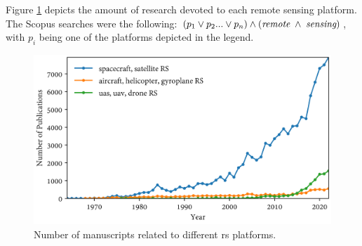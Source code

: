 Figure \ref{fig:scopus_search_platforms} depicts the amount of research devoted to each remote sensing platform. The Scopus searches were the following: $(p_1 \lor p_2 ... \lor p_n) \land (\textit{remote} \hspace{1mm} \land \hspace{1mm} \textit{sensing})$, with $p_i$ being one of the platforms depicted in the legend. 

\begin{figure}[!ht]
	\includegraphics[width=\linewidth]{figs/introduction/platform_timeline.png}
	\caption{Number of manuscripts related to different \acrshort{rs} platforms. }
    \label{fig:scopus_search_platforms}
\end{figure}

